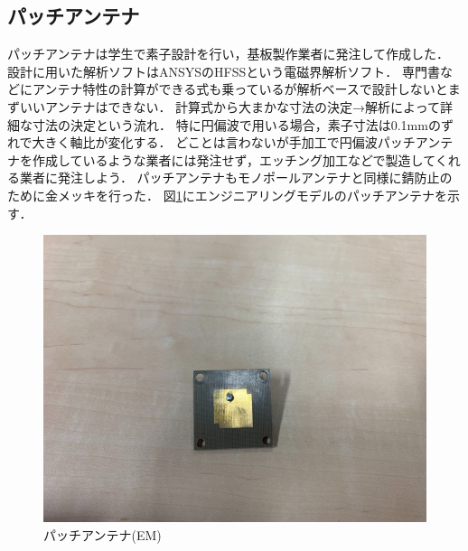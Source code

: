 \subsection{パッチアンテナ}
パッチアンテナは学生で素子設計を行い，基板製作業者に発注して作成した．
設計に用いた解析ソフトはANSYSのHFSSという電磁界解析ソフト．
専門書などにアンテナ特性の計算ができる式も乗っているが解析ベースで設計しないとまずいいアンテナはできない．
計算式から大まかな寸法の決定→解析によって詳細な寸法の決定という流れ．
特に円偏波で用いる場合，素子寸法は0.1mmのずれで大きく軸比が変化する．
どことは言わないが手加工で円偏波パッチアンテナを作成しているような業者には発注せず，エッチング加工などで製造してくれる業者に発注しよう．
パッチアンテナもモノポールアンテナと同様に錆防止のために金メッキを行った．
図\ref{fig4-7-0-1}にエンジニアリングモデルのパッチアンテナを示す．
\begin{figure}[H]
	\centering
	\includegraphics[scale=0.5]{04/fig/4-7-0-1.jpg}
	\caption{パッチアンテナ(EM)}
	\label{fig4-7-0-1}
\end{figure}

